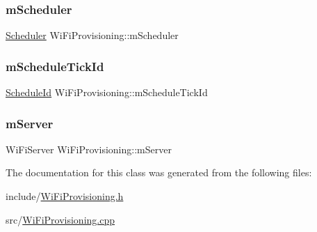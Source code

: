 \subsubsection{\texorpdfstring{m\+Scheduler}{mScheduler}}
{\footnotesize\ttfamily \mbox{\hyperlink{class_scheduler}{Scheduler}} Wi\+Fi\+Provisioning\+::m\+Scheduler\hspace{0.3cm}{\ttfamily [private]}}

\mbox{\label{class_wi_fi_provisioning_a53fd157ea3bae357292188eba8dc81b6}} 
\subsubsection{\texorpdfstring{m\+Schedule\+Tick\+Id}{mScheduleTickId}}
{\footnotesize\ttfamily \mbox{\hyperlink{_scheduler_8h_a1e3b4605bdcbb8f6df7c47013e26e910}{Schedule\+Id}} Wi\+Fi\+Provisioning\+::m\+Schedule\+Tick\+Id\hspace{0.3cm}{\ttfamily [private]}}

\mbox{\label{class_wi_fi_provisioning_a88e571f1efd1e428e43209112b8c7171}} 
\subsubsection{\texorpdfstring{m\+Server}{mServer}}
{\footnotesize\ttfamily Wi\+Fi\+Server Wi\+Fi\+Provisioning\+::m\+Server\hspace{0.3cm}{\ttfamily [private]}}



The documentation for this class was generated from the following files\+:\begin{DoxyCompactItemize}
\item 
include/\mbox{\hyperlink{_wi_fi_provisioning_8h}{Wi\+Fi\+Provisioning.\+h}}\item 
src/\mbox{\hyperlink{_wi_fi_provisioning_8cpp}{Wi\+Fi\+Provisioning.\+cpp}}\end{DoxyCompactItemize}
